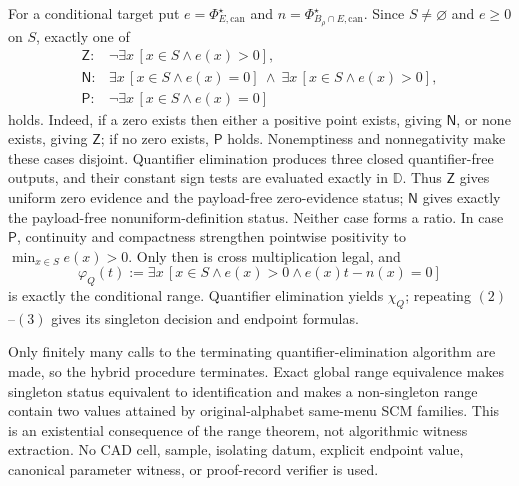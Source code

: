 For a conditional target put \(e=\Phi_{E,\mathrm{can}}^\star\) and \(n=\Phi_{B_\rho\cap E,\mathrm{can}}^\star\).  Since \(S\ne\varnothing\) and \(e\geq0\) on \(S\), exactly one of
\[
\begin{array}{ll}
\mathsf Z:&\neg\exists x\,[x\in S\wedge e(x)>0],\\
\mathsf N:&\exists x\,[x\in S\wedge e(x)=0]
\ \wedge\ \exists x\,[x\in S\wedge e(x)>0],\\
\mathsf P:&\neg\exists x\,[x\in S\wedge e(x)=0]
\end{array}
\tag{4}
\]
holds.  Indeed, if a zero exists then either a positive point exists, giving \(\mathsf N\), or none exists, giving \(\mathsf Z\); if no zero exists, \(\mathsf P\) holds.  Nonemptiness and nonnegativity make these cases disjoint.  Quantifier elimination produces three closed quantifier-free outputs, and their constant sign tests are evaluated exactly in \(\mathbb D\).  Thus \(\mathsf Z\) gives uniform zero evidence and the payload-free zero-evidence status; \(\mathsf N\) gives exactly the payload-free nonuniform-definition status.  Neither case forms a ratio.  In case \(\mathsf P\), continuity and compactness strengthen pointwise positivity to \(\min_{x\in S}e(x)>0\).  Only then is cross multiplication legal, and
\[
\varphi_Q(t):=
\exists x\,[x\in S\wedge e(x)>0\wedge e(x)t-n(x)=0]
\tag{5}
\]
is exactly the conditional range.  Quantifier elimination yields \(\chi_Q\); repeating \((2)\)--\((3)\) gives its singleton decision and endpoint formulas.

Only finitely many calls to the terminating quantifier-elimination algorithm are made, so the hybrid procedure terminates.  Exact global range equivalence makes singleton status equivalent to identification and makes a non-singleton range contain two values attained by original-alphabet same-menu SCM families.  This is an existential consequence of the range theorem, not algorithmic witness extraction.  No CAD cell, sample, isolating datum, explicit endpoint value, canonical parameter witness, or proof-record verifier is used.